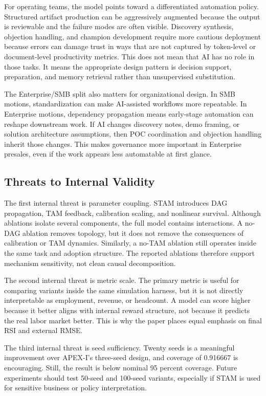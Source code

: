 \documentclass[10pt,conference]{IEEEtran}
\begin{document}
For operating teams, the model points toward a differentiated automation policy. Structured artifact production can be aggressively augmented because the output is reviewable and the failure modes are often visible. Discovery synthesis, objection handling, and champion development require more cautious deployment because errors can damage trust in ways that are not captured by token-level or document-level productivity metrics. This does not mean that AI has no role in those tasks. It means the appropriate design pattern is decision support, preparation, and memory retrieval rather than unsupervised substitution.

The Enterprise/SMB split also matters for organizational design. In SMB motions, standardization can make AI-assisted workflows more repeatable. In Enterprise motions, dependency propagation means early-stage automation can reshape downstream work. If AI changes discovery notes, demo framing, or solution architecture assumptions, then POC coordination and objection handling inherit those changes. This makes governance more important in Enterprise presales, even if the work appears less automatable at first glance.

\subsection{Threats to Internal Validity}
The first internal threat is parameter coupling. STAM introduces DAG propagation, TAM feedback, calibration scaling, and nonlinear survival. Although ablations isolate several components, the full model contains interactions. A no-DAG ablation removes topology, but it does not remove the consequences of calibration or TAM dynamics. Similarly, a no-TAM ablation still operates inside the same task and adoption structure. The reported ablations therefore support mechanism sensitivity, not clean causal decomposition.

The second internal threat is metric scale. The primary metric is useful for comparing variants inside the same simulation harness, but it is not directly interpretable as employment, revenue, or headcount. A model can score higher because it better aligns with internal reward structure, not because it predicts the real labor market better. This is why the paper places equal emphasis on final RSI and external RMSE.

The third internal threat is seed sufficiency. Twenty seeds is a meaningful improvement over APEX-I's three-seed design, and coverage of 0.916667 is encouraging. Still, the result is below nominal 95 percent coverage. Future experiments should test 50-seed and 100-seed variants, especially if STAM is used for sensitive business or policy interpretation.
\end{document}
